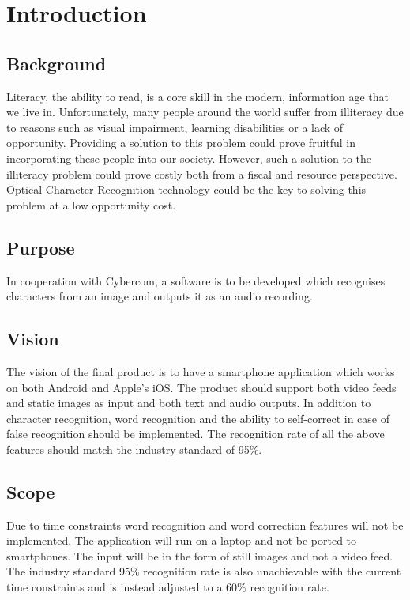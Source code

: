 \documentclass[a4paper, english, abstract=on]{scrartcl}
\begin{document}
\pagebreak

\section{Introduction}
\subsection{Background}
Literacy, the ability to read, is a core skill in the modern, information age
that we live in. Unfortunately, many people around the world suffer from
illiteracy due to reasons such as visual impairment, learning disabilities or
a lack of opportunity. Providing a solution to this problem could prove
fruitful in incorporating these people into our society. However, such a
solution to the illiteracy problem could prove costly both from a fiscal and
resource perspective. Optical Character Recognition technology could be the
key to solving this problem at a low opportunity cost.
\subsection{Purpose}
In cooperation with Cybercom, a software is to be developed which recognises
characters from an image and outputs it as an audio recording.
\subsection{Vision}
The vision of the final product is to have a smartphone application which
works on both Android and Apple’s iOS. The product should support both video
feeds and static images as input and both text and audio outputs. In addition
to character recognition, word recognition and the ability to self-correct in
case of false recognition should be implemented. The recognition rate of all
the above features should match the industry standard of 95\%.

\subsection{Scope}
Due to time constraints word recognition and word correction features will not
 be implemented. The application will run on a laptop and not be ported to
 smartphones. The input will be in the form of still images and not a video
 feed. The industry standard 95\% recognition rate is also unachievable with
 the current time constraints and is instead adjusted to a 60\% recognition
 rate.
\end{document}
